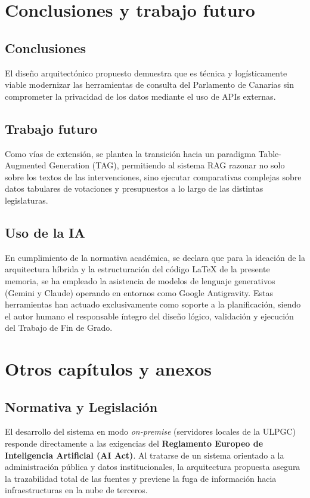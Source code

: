 \documentclass[oneside,12pt]{book}
\begin{document}
\chapter{Conclusiones y trabajo futuro}
%

\section{Conclusiones}
El diseño arquitectónico propuesto demuestra que es técnica y logísticamente viable modernizar las herramientas de consulta del Parlamento de Canarias sin comprometer la privacidad de los datos mediante el uso de APIs externas.

\section{Trabajo futuro}
Como vías de extensión, se plantea la transición hacia un paradigma Table-Augmented Generation (TAG), permitiendo al sistema RAG razonar no solo sobre los textos de las intervenciones, sino ejecutar comparativas complejas sobre datos tabulares de votaciones y presupuestos a lo largo de las distintas legislaturas.

\section{Uso de la IA}
En cumplimiento de la normativa académica, se declara que para la ideación de la arquitectura híbrida y la estructuración del código LaTeX de la presente memoria, se ha empleado la asistencia de modelos de lenguaje generativos (Gemini y Claude) operando en entornos como Google Antigravity. Estas herramientas han actuado exclusivamente como soporte a la planificación, siendo el autor humano el responsable íntegro del diseño lógico, validación y ejecución del Trabajo de Fin de Grado.

\chapter{Otros capítulos y anexos}

\section{Normativa y Legislación}
El desarrollo del sistema en modo \textit{on-premise} (servidores locales de la ULPGC) responde directamente a las exigencias del \textbf{Reglamento Europeo de Inteligencia Artificial (AI Act)}. Al tratarse de un sistema orientado a la administración pública y datos institucionales, la arquitectura propuesta asegura la trazabilidad total de las fuentes y previene la fuga de información hacia infraestructuras en la nube de terceros.



\clearpage

\printglossaries
\end{document}
